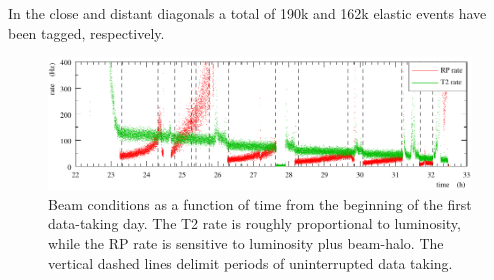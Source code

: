 In the close and distant diagonals a total of 190k and 162k elastic events have
been tagged, respectively.


\begin{figure}
\begin{center}
\includegraphics{fig/overview.pdf}
\vskip-3mm
\caption{%
Beam conditions as a function of time from the beginning of the first data-taking day. The T2 rate is roughly proportional to luminosity, while the RP rate is sensitive to luminosity plus beam-halo. The vertical dashed lines delimit periods of uninterrupted data taking.
}
\label{fig:overview}
\end{center}
\end{figure}
